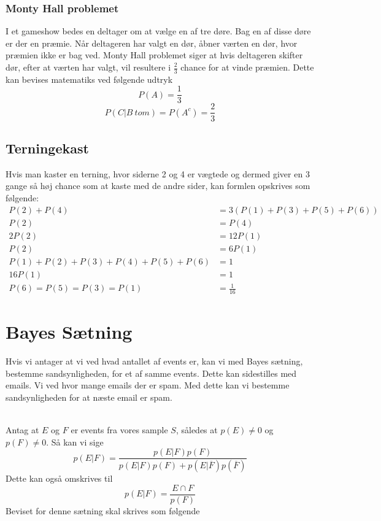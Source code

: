 \subsubsection{Monty Hall problemet}
I et gameshow bedes en deltager om at vælge en af tre døre. Bag en af disse døre er der en præmie. Når deltageren har valgt en dør, åbner værten en dør, hvor præmien ikke er bag ved. Monty Hall problemet siger at hvis deltageren skifter dør, efter at værten har valgt, vil resultere i $\frac{2}{3}$ chance for at vinde præmien. Dette kan bevises matematiks ved følgende udtryk
\begin{equation}
P(A)=\frac{1}{3}
\end{equation}
\begin{equation}
P(C|B\ tom)=P(A^c)=\frac{2}{3}
\end{equation}

\subsection{Terningekast}
Hvis man kaster en terning, hvor siderne 2 og 4 er vægtede og dermed giver en 3 gange så høj chance som at kaste med de andre sider, kan formlen opskrives som følgende:
\begin{align*}
	P(2)+P(4)&=3(P(1)+P(3)+P(5)+P(6))\\
	P(2)&=P(4)\\
	2P(2)&=12P(1)\\
	P(2)&=6P(1)\\
	P(1)+P(2)+P(3)+P(4)+P(5)+P(6)&=1\\
	16P(1)&=1\\
	P(6)=P(5)=P(3)=P(1)&=\frac{1}{16}
\end{align*}

\section{Bayes Sætning}
Hvis vi antager at vi ved hvad antallet af events er, kan vi med Bayes sætning, bestemme sandsynligheden, for et af samme events. Dette kan sidestilles med emails. Vi ved hvor mange emails der er spam. Med dette kan vi bestemme sandsynligheden for at næste email er spam.
\\\\
\begin{frtheo}
Antag at $E$ og $F$ er events fra vores sample $S$, således at $p(E)\neq0$ og $p(F)\neq0$. Så kan vi sige
\begin{equation}
	p(E|F)=\frac{p(E|F)p(F)}{p(E|F)p(F)+p(E|\overline{F})p(\overline{F})}
\end{equation}
Dette kan også omskrives til
\begin{equation}
	p(E|F)=\frac{E\cap F}{p(F)}
\end{equation}
Beviset for denne sætning skal skrives som følgende

\end{frtheo}


